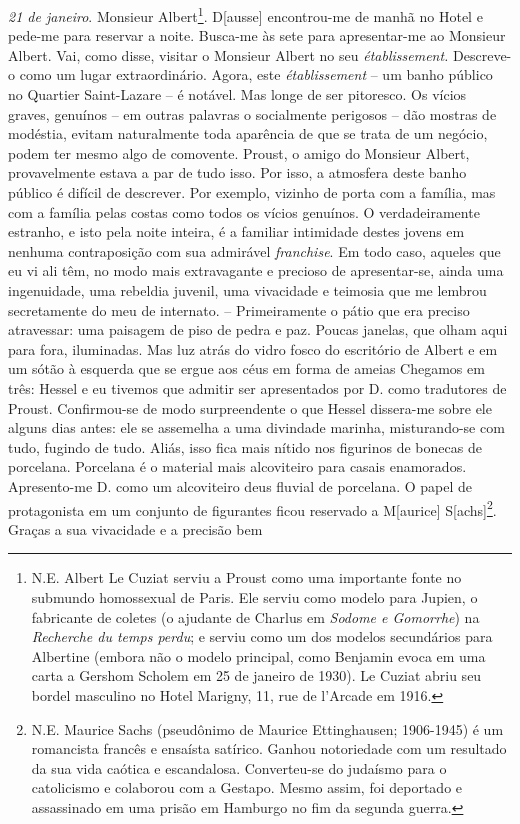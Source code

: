 \emph{21 de janeiro}. Monsieur Albert\footnote{N.E. Albert Le Cuziat
  serviu a Proust como uma importante fonte no submundo homossexual de
  Paris. Ele serviu como modelo para Jupien, o fabricante de coletes (o
  ajudante de Charlus em \emph{Sodome e Gomorrhe}) na \emph{Recherche du
  temps perdu}; e serviu como um dos modelos secundários para Albertine
  (embora não o modelo principal, como Benjamin evoca em uma carta a
  Gershom Scholem em 25 de janeiro de 1930). Le Cuziat abriu seu bordel
  masculino no Hotel Marigny, 11, rue de l'Arcade em 1916.}.
D{[}ausse{]} encontrou-me de manhã no Hotel e pede-me para reservar a
noite. Busca-me às sete para apresentar-me ao Monsieur Albert. Vai, como
disse, visitar o Monsieur Albert no seu \emph{établissement.} Descreve-o
como um lugar extraordinário. Agora, este \emph{établissement} -- um
banho público no Quartier Saint-Lazare -- é notável. Mas longe de ser
pitoresco. Os vícios graves, genuínos -- em outras palavras o
socialmente perigosos -- dão mostras de modéstia, evitam naturalmente
toda aparência de que se trata de um negócio, podem ter mesmo algo de
comovente. Proust, o amigo do Monsieur Albert, provavelmente estava a
par de tudo isso. Por isso, a atmosfera deste banho público é difícil de
descrever. Por exemplo, vizinho de porta com a família, mas com a
família pelas costas como todos os vícios genuínos. O verdadeiramente
estranho, e isto pela noite inteira, é a familiar intimidade destes
jovens em nenhuma contraposição com sua admirável \emph{franchise}. Em
todo caso, aqueles que eu vi ali têm, no modo mais extravagante e
precioso de apresentar-se, ainda uma ingenuidade, uma rebeldia juvenil,
uma vivacidade e teimosia que me lembrou secretamente do meu de
internato. -- Primeiramente o pátio que era preciso atravessar: uma
paisagem de piso de pedra e paz. Poucas janelas, que olham aqui para
fora, iluminadas. Mas luz atrás do vidro fosco do escritório de Albert e
em um sótão à esquerda que se ergue aos céus em forma de ameias Chegamos
em três: Hessel e eu tivemos que admitir ser apresentados por D. como
tradutores de Proust. Confirmou-se de modo surpreendente o que Hessel
dissera-me sobre ele alguns dias antes: ele se assemelha a uma divindade
marinha, misturando-se com tudo, fugindo de tudo. Aliás, isso fica mais
nítido nos figurinos de bonecas de porcelana. Porcelana é o material
mais alcoviteiro para casais enamorados. Apresento-me D. como um
alcoviteiro deus fluvial de porcelana. O papel de protagonista em um
conjunto de figurantes ficou reservado a M{[}aurice{]}
S{[}achs{]}\footnote{N.E. Maurice Sachs (pseudônimo de Maurice
  Ettinghausen; 1906-1945) é um romancista francês e ensaísta satírico.
  Ganhou notoriedade com um resultado da sua vida caótica e escandalosa.
  Converteu-se do judaísmo para o catolicismo e colaborou com a Gestapo.
  Mesmo assim, foi deportado e assassinado em uma prisão em Hamburgo no
  fim da segunda guerra.}. Graças a sua vivacidade e a precisão bem
